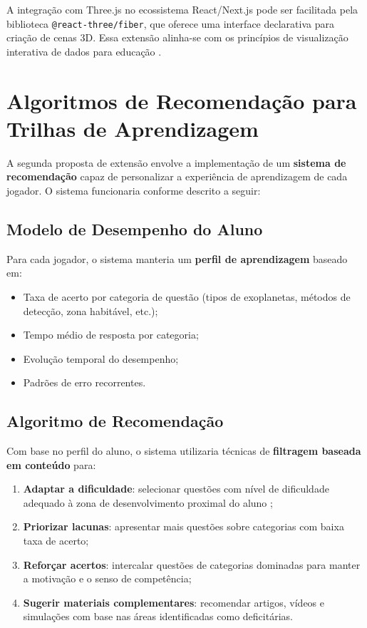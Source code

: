 \documentclass[
	12pt,
	openany,
	oneside,
	a4paper,
	english,
	brazil
]{abntex2}
\begin{document}
A integração com Three.js no ecossistema React/Next.js pode ser facilitada pela biblioteca \texttt{@react-three/fiber}, que oferece uma interface declarativa para criação de cenas 3D. Essa extensão alinha-se com os princípios de visualização interativa de dados para educação \cite{murray2013}.

\section{Algoritmos de Recomendação para Trilhas de Aprendizagem}

A segunda proposta de extensão envolve a implementação de um \textbf{sistema de recomendação} capaz de personalizar a experiência de aprendizagem de cada jogador. O sistema funcionaria conforme descrito a seguir:

\subsection{Modelo de Desempenho do Aluno}

Para cada jogador, o sistema manteria um \textbf{perfil de aprendizagem} baseado em:

\begin{itemize}
  \item Taxa de acerto por categoria de questão (tipos de exoplanetas, métodos de detecção, zona habitável, etc.);
  \item Tempo médio de resposta por categoria;
  \item Evolução temporal do desempenho;
  \item Padrões de erro recorrentes.
\end{itemize}

\subsection{Algoritmo de Recomendação}

Com base no perfil do aluno, o sistema utilizaria técnicas de \textbf{filtragem baseada em conteúdo} \cite{ricci2011} para:

\begin{enumerate}
  \item \textbf{Adaptar a dificuldade}: selecionar questões com nível de dificuldade adequado à zona de desenvolvimento proximal do aluno \cite{vygotsky1978};
  \item \textbf{Priorizar lacunas}: apresentar mais questões sobre categorias com baixa taxa de acerto;
  \item \textbf{Reforçar acertos}: intercalar questões de categorias dominadas para manter a motivação e o senso de competência;
  \item \textbf{Sugerir materiais complementares}: recomendar artigos, vídeos e simulações com base nas áreas identificadas como deficitárias.
\end{enumerate}
\end{document}
